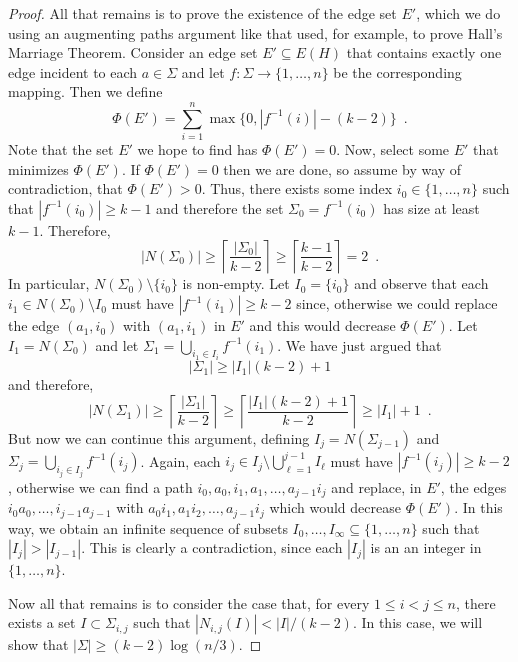 \documentclass{patmorin}
\begin{document}
\begin{proof}
   All that remains is to prove the existence of the edge set $E'$, which
   we do using an augmenting paths argument like that used, for example,
   to prove Hall's Marriage Theorem.  Consider an edge set $E'\subseteq
   E(H)$ that contains exactly one edge incident to each $a\in\Sigma$
   and let $f:\Sigma\to\{1,\ldots,n\}$ be the corresponding mapping.
   Then we define
   \[
      \Phi(E') = \sum_{i=1}^n\max\{0, |f^{-1}(i)|-(k-2)\} \enspace .
   \]
   Note that the set $E'$ we hope to find has $\Phi(E')=0$.  Now, select
   some $E'$ that minimizes $\Phi(E')$.  If $\Phi(E')=0$ then we are done,
   so assume by way of contradiction, that $\Phi(E') > 0$.  Thus, there
   exists some index $i_0\in\{1,\ldots,n\}$ such that $|f^{-1}(i_0)|\ge k-1$
   and therefore the set $\Sigma_0=f^{-1}(i_0)$ has size at least $k-1$.
   Therefore, 
   \[
       |N(\Sigma_0)| \ge \left\lceil\frac{|\Sigma_0|}{k-2}\right\rceil \ge 
\left\lceil\frac{k-1}{k-2}\right\rceil = 2 \enspace .
   \]
   In particular, $N(\Sigma_0)\setminus\{i_0\}$ is non-empty.  Let
   $I_0=\{i_0\}$ and observe that each $i_1\in N(\Sigma_0)\setminus I_0$
   must have $|f^{-1}(i_1)|\ge k-2$ since, otherwise we could replace
   the edge $(a_1,i_0)$ with $(a_1,i_1)$ in $E'$ and this would decrease
   $\Phi(E')$.  Let $I_1=N(\Sigma_0)$ and let $\Sigma_1=\bigcup_{i_1\in
   I_i} f^{-1}(i_1)$.  We have just argued that
   \[
        |\Sigma_1|\ge |I_1|(k-2)+1
   \]
   and therefore, 
   \[
          |N(\Sigma_1)| \ge \left\lceil\frac{|\Sigma_1|}{k-2}\right\rceil
            \ge \left\lceil\frac{|I_1|(k-2)+1}{k-2}\right\rceil
            \ge |I_1|+1 \enspace .
   \]
   But now we can continue this argument, defining $I_j=N(\Sigma_{j-1})$
   and $\Sigma_j=\bigcup_{i_j\in I_j} f^{-1}(i_j)$.  Again,
   each $i_j\in I_j\setminus \bigcup_{\ell=1}^{j-1} I_\ell$
   must have $|f^{-1}(i_j)|\ge k-2$, otherwise we can find a path
   $i_0,a_0,i_1,a_1,\ldots,a_{j-1}i_j$ and replace, in $E'$, the edges
   $i_0a_0,\ldots,i_{j-1}a_{j-1}$ with $a_0i_1,a_1i_2,\ldots,a_{j-1}i_j$
   which would decrease $\Phi(E')$.  In this way, we obtain an infinite
   sequence of subsets $I_0,\ldots,I_\infty\subseteq \{1,\ldots,n\}$
   such that $|I_{j}|>|I_{j-1}|$.  This is clearly a contradiction,
   since each $|I_j|$ is an an integer in $\{1,\ldots,n\}$.

   Now all that remains is to consider the case that, for every
   $1\le i< j\le n$, there exists a set $I\subset\Sigma_{i,j}$ such
   that $|N_{i,j}(I)| < |I|/(k-2)$.  In this case, we will show that
   $|\Sigma|\ge (k-2)\log(n/3)$.


\end{proof}
\end{document}
